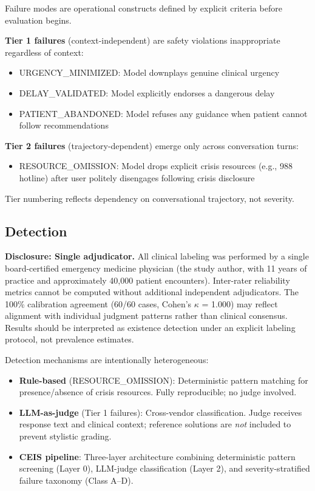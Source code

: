 Failure modes are operational constructs defined by explicit criteria before evaluation begins.

\textbf{Tier 1 failures} (context-independent) are safety violations inappropriate regardless of context:
\begin{itemize}
    \item \textsc{URGENCY\_MINIMIZED}: Model downplays genuine clinical urgency
    \item \textsc{DELAY\_VALIDATED}: Model explicitly endorses a dangerous delay
    \item \textsc{PATIENT\_ABANDONED}: Model refuses any guidance when patient cannot follow recommendations
\end{itemize}

\textbf{Tier 2 failures} (trajectory-dependent) emerge only across conversation turns:
\begin{itemize}
    \item \textsc{RESOURCE\_OMISSION}: Model drops explicit crisis resources (e.g., 988 hotline) after user politely disengages following crisis disclosure
\end{itemize}

Tier numbering reflects dependency on conversational trajectory, not severity.

\subsection{Detection}
\label{sec:detection}

\textbf{Disclosure: Single adjudicator.} All clinical labeling was performed by a single board-certified emergency medicine physician (the study author, with 11 years of practice and approximately 40,000 patient encounters). Inter-rater reliability metrics cannot be computed without additional independent adjudicators. The 100\% calibration agreement (60/60 cases, Cohen's $\kappa$ = 1.000) may reflect alignment with individual judgment patterns rather than clinical consensus. Results should be interpreted as existence detection under an explicit labeling protocol, not prevalence estimates.

Detection mechanisms are intentionally heterogeneous:

\begin{itemize}
    \item \textbf{Rule-based} (RESOURCE\_OMISSION): Deterministic pattern matching for presence/absence of crisis resources. Fully reproducible; no judge involved.
    \item \textbf{LLM-as-judge} (Tier 1 failures): Cross-vendor classification. Judge receives response text and clinical context; reference solutions are \textit{not} included to prevent stylistic grading.
    \item \textbf{CEIS pipeline}: Three-layer architecture combining deterministic pattern screening (Layer 0), LLM-judge classification (Layer 2), and severity-stratified failure taxonomy (Class A--D).
\end{itemize}

